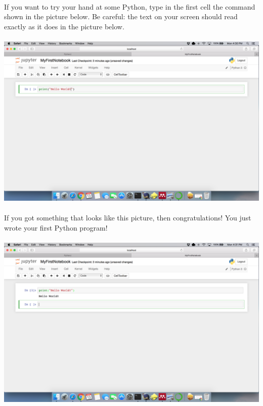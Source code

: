 \documentclass[]{article}
\begin{document}
\paragraph{}
If you want to try your hand at some Python, type in the first cell the command shown in the picture below. Be careful: the text on your screen should read exactly as it does in the picture below.
\paragraph{}
\begin{centering}
    \centerline{\includegraphics[scale=0.35]{Screenshot_23.png}}
\end{centering}

\paragraph{}
If you got something that looks like this picture, then congratulations! You just wrote your first Python program!
\paragraph{}
\begin{centering}
    \centerline{\includegraphics[scale=0.35]{Screenshot_24.png}}
\end{centering}
\end{document}

